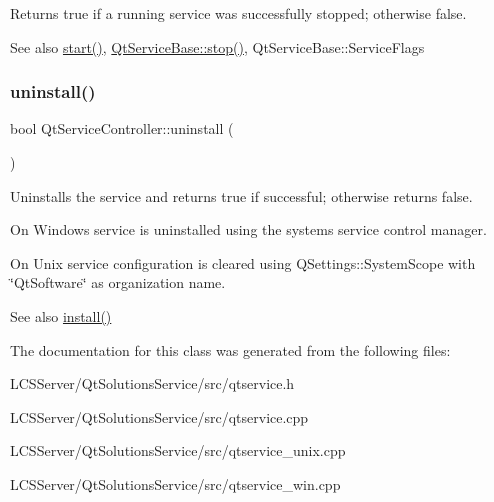 Returns true if a running service was successfully stopped; otherwise false.

\begin{DoxySeeAlso}{See also}
\hyperlink{class_qt_service_controller_a5e9d6da5081d70f31611456d0ef0687e}{start()}, \hyperlink{class_qt_service_base_a8d52c1b8fd06b50bdc0a0c6f9936a68e}{Qt\+Service\+Base\+::stop()}, Qt\+Service\+Base\+::\+Service\+Flags 
\end{DoxySeeAlso}
\mbox{\label{class_qt_service_controller_a25cd2f1f6868ece5de77976eb55cb74c}} 
\subsubsection{\texorpdfstring{uninstall()}{uninstall()}}
{\footnotesize\ttfamily bool Qt\+Service\+Controller\+::uninstall (\begin{DoxyParamCaption}{ }\end{DoxyParamCaption})}

Uninstalls the service and returns true if successful; otherwise returns false.

On Windows service is uninstalled using the system\textquotesingle{}s service control manager.

On Unix service configuration is cleared using Q\+Settings\+::\+System\+Scope with \char`\"{}\+Qt\+Software\char`\"{} as organization name.

\begin{DoxySeeAlso}{See also}
\hyperlink{class_qt_service_controller_a7e2b85e911ff152557dd25959e76094b}{install()} 
\end{DoxySeeAlso}


The documentation for this class was generated from the following files\+:\begin{DoxyCompactItemize}
\item 
L\+C\+S\+Server/\+Qt\+Solutions\+Service/src/qtservice.\+h\item 
L\+C\+S\+Server/\+Qt\+Solutions\+Service/src/qtservice.\+cpp\item 
L\+C\+S\+Server/\+Qt\+Solutions\+Service/src/qtservice\+\_\+unix.\+cpp\item 
L\+C\+S\+Server/\+Qt\+Solutions\+Service/src/qtservice\+\_\+win.\+cpp\end{DoxyCompactItemize}
